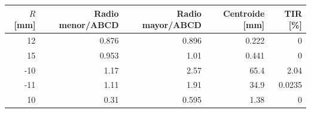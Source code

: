 \begin{tabular}{rrrrr}\toprule
$R$ [mm] & Radio menor/ABCD & Radio mayor/ABCD & Centroide [mm] & TIR [\%]\\\midrule
12 & 0.876 & 0.896 & 0.222 & 0 \\
15 & 0.953 & 1.01 & 0.441 & 0 \\
-10 & 1.17 & 2.57 & 65.4 & 2.04 \\
-11 & 1.11 & 1.91 & 34.9 & 0.0235 \\
10 & 0.31 & 0.595 & 1.38 & 0 \\
\bottomrule\end{tabular}
